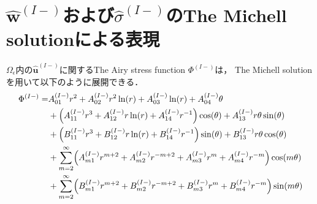 \section{$\hat{\bm{w}}^{(I-)}$および$\hat{\sigma}^{(I-)}$のThe Michell solutionによる表現}

$\Omega_\epsilon$内の$\hat{\bm{u}}^{(I-)}$に関するThe Airy stress function $\Phi^{(I-)}$は，
The Michell solutionを用いて以下のように展開できる．
\begin{align}
	\Phi^{(I-)} =&A_{01}^{(I-)}r^2+A_{02}^{(I-)}r^2\ln(r)+A_{03}^{(I-)}\ln(r)+A_{04}^{(I-)}\theta
	\nonumber
	\\
	&+\Bigl(A_{11}^{(I-)}r^3+A_{12}^{(I-)}r\ln(r)+A_{14}^{(I-)}r^{-1}\Bigr)\cos(\theta)+A_{13}^{(I-)}r\theta \sin(\theta)
	\nonumber
	\\
	&+\Bigl(B_{11}^{(I-)}r^3+B_{12}^{(I-)}r\ln(r)+B_{14}^{(I-)}r^{-1}\Bigr)\sin(\theta)+B_{13}^{(I-)}r\theta \cos(\theta)
	\nonumber
	\\
	&+\sum_{m=2}^{\infty}\Bigl(A_{m1}^{(I-)}r^{m+2}+A_{m2}^{(I-)}r^{-m+2}
	+A_{m3}^{(I-)}r^{m}+A_{m4}^{(I-)}r^{-m}\Bigr)\cos(m\theta)
	\nonumber
	\\
	&+\sum_{m=2}^{\infty}\Bigl(B_{m1}^{(I-)}r^{m+2}+B_{m2}^{(I-)}r^{-m+2}
	+B_{m3}^{(I-)}r^{m}+B_{m4}^{(I-)}r^{-m}\Bigr)\sin(m\theta)
	\label{eq:AiryIn1}
\end{align}

